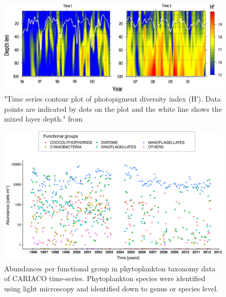 %
%
%
%
%
%
%
%
%
%
%

\begin{figure}
\centering
\includegraphics[trim = 0mm 0mm 0mm 0mm, clip, width=.8\linewidth]{./Chp3-Further/PinckneyDiversityPigmentData.jpg}
\caption[Scheme]{\small {"Time series contour plot of photopigment diversity index (H′). Data points are indicated by dots on the plot and the white line shows the mixed layer depth." from \citet{Pinckney2015}}}
\label{PrinComp}
\end{figure}


\begin{figure}
\centering
\includegraphics[trim = 0mm 0mm 0mm 0mm, clip, width=1.\linewidth]{./Chp3-Further/AbundancesAsset111.png}
\caption[Scheme]{\small {Abundances per functional group in phytoplankton taxonomy data of CARIACO time-series. Phytoplankton species were identified using light microscopy and identified down to genus or species level.}}
\label{Abundances}
\end{figure}




